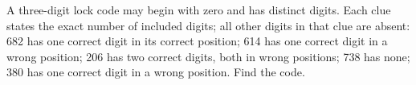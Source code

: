 A three-digit lock code may begin with zero and has distinct digits. Each clue states the exact number of included digits; all other digits in that clue are absent: 682 has one correct digit in its correct position; 614 has one correct digit in a wrong position; 206 has two correct digits, both in wrong positions; 738 has none; 380 has one correct digit in a wrong position. Find the code.
